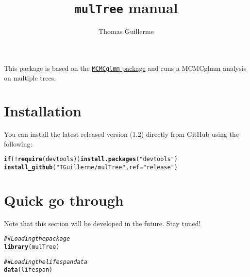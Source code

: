 \documentclass{article}\usepackage[]{graphicx}\usepackage[]{color}
\makeatletter
\newcommand{\hlstr}[1]{\textcolor[rgb]{0.192,0.494,0.8}{#1}}%
\newcommand{\hlcom}[1]{\textcolor[rgb]{0.678,0.584,0.686}{\textit{#1}}}%
\newcommand{\hlopt}[1]{\textcolor[rgb]{0,0,0}{#1}}%
\newcommand{\hlstd}[1]{\textcolor[rgb]{0.345,0.345,0.345}{#1}}%
\newcommand{\hlkwa}[1]{\textcolor[rgb]{0.161,0.373,0.58}{\textbf{#1}}}%
\newcommand{\hlkwc}[1]{\textcolor[rgb]{0.333,0.667,0.333}{#1}}%
\newcommand{\hlkwd}[1]{\textcolor[rgb]{0.737,0.353,0.396}{\textbf{#1}}}%
\newenvironment{kframe}{%
 \def\at@end@of@kframe{}%
 \ifinner\ifhmode%
  \def\at@end@of@kframe{\end{minipage}}%
  \begin{minipage}{\columnwidth}%
 \fi\fi%
 \def\FrameCommand##1{\hskip\@totalleftmargin \hskip-\fboxsep
 \colorbox{shadecolor}{##1}\hskip-\fboxsep
     \hskip-\linewidth \hskip-\@totalleftmargin \hskip\columnwidth}%
 \MakeFramed {\advance\hsize-\width
   \@totalleftmargin\z@ \linewidth\hsize
   \@setminipage}}%
 {\par\unskip\endMakeFramed%
 \at@end@of@kframe}
\newenvironment{knitrout}{}{} %
\makeatother
\begin{document}
\title{\texttt{mulTree} manual}


\author{Thomas Guillerme}

\maketitle

This package is based on the \href{http://cran.r-project.org/web/packages/MCMCglmm/index.html}{\texttt{MCMCglmm} package} and runs a MCMCglmm analysis on multiple trees.

\section{Installation}
You can install the latest released version (1.2) directly from GitHub using the following:

\begin{knitrout}
\color{fgcolor}\begin{kframe}
\begin{alltt}
\hlkwa{if}\hlstd{(}\hlopt{!}\hlkwd{require}\hlstd{(devtools))} \hlkwd{install.packages}\hlstd{(}\hlstr{"devtools"}\hlstd{)}
\hlkwd{install_github}\hlstd{(}\hlstr{"TGuillerme/mulTree"}\hlstd{,} \hlkwc{ref} \hlstd{=} \hlstr{"release"}\hlstd{)}
\end{alltt}
\end{kframe}
\end{knitrout}


\section{Quick go through}

Note that this section will be developed in the future.
Stay tuned!

\begin{knitrout}
\color{fgcolor}\begin{kframe}
\begin{alltt}
\hlcom{## Loading the package}
\hlkwd{library}\hlstd{(mulTree)}
\end{alltt}


{\ttfamily\noindent\itshape\color{messagecolor}{\#\# Loading required package: caper\\\#\# Loading required package: MASS\\\#\# Loading required package: mvtnorm\\\#\# Loading required package: coda\\\#\# Loading required package: hdrcde\\\#\# hdrcde 3.1 loaded\\\#\# \\\#\# Loading required package: MCMCglmm\\\#\# Loading required package: Matrix}}\begin{alltt}
\hlcom{## Loading the lifespan data}
\hlkwd{data}\hlstd{(lifespan)}
\end{alltt}
\end{kframe}
\end{knitrout}
\end{document}
